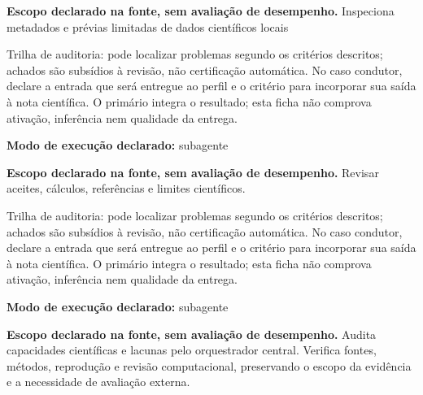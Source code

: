 \begin{descricao}
\textbf{Escopo declarado na fonte, sem avaliação de desempenho.}
Inspeciona metadados e prévias limitadas de dados científicos locais
\end{descricao}

\begin{funcao}
Trilha de auditoria: pode localizar problemas segundo os critérios descritos; achados são subsídios à revisão, não certificação automática. No caso condutor, declare a entrada que será entregue ao perfil e o critério para incorporar sua saída à nota científica. O primário integra o resultado; esta ficha não comprova ativação, inferência nem qualidade da entrega.
\end{funcao}

\begin{arquitetura}
\textbf{Modo de execução declarado:} subagente
\end{arquitetura}


\begin{descricao}
\textbf{Escopo declarado na fonte, sem avaliação de desempenho.}
Revisar aceites, cálculos, referências e limites científicos.
\end{descricao}

\begin{funcao}
Trilha de auditoria: pode localizar problemas segundo os critérios descritos; achados são subsídios à revisão, não certificação automática. No caso condutor, declare a entrada que será entregue ao perfil e o critério para incorporar sua saída à nota científica. O primário integra o resultado; esta ficha não comprova ativação, inferência nem qualidade da entrega.
\end{funcao}

\begin{arquitetura}
\textbf{Modo de execução declarado:} subagente
\end{arquitetura}


\begin{descricao}
\textbf{Escopo declarado na fonte, sem avaliação de desempenho.}
Audita capacidades científicas e lacunas pelo orquestrador central. Verifica fontes, métodos, reprodução e revisão computacional, preservando o escopo da evidência e a necessidade de avaliação externa.
\end{descricao}

